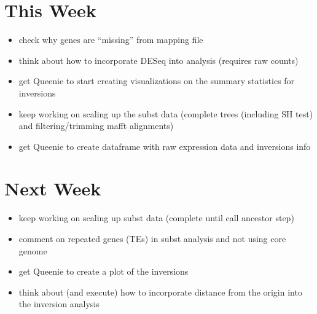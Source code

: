 \documentclass[12pt]{article}
\begin{document}

\section*{This Week}
%
\begin{itemize}
	\item check why genes are ``missing'' from mapping file
	\item think about how to incorporate DESeq into analysis (requires raw counts)
	\item get Queenie to start creating visualizations on the summary statistics for inversions
	\item keep working on scaling up the subst data (complete trees (including SH test) and filtering/trimming mafft alignments)
	\item get Queenie to create dataframe with raw expression data and inversions info
	
\end{itemize}


\section*{Next Week}
\begin{itemize}
	\item keep working on scaling up subst data (complete until call ancestor step)
	\item comment on repeated genes (TEs) in subst analysis and not using core genome
	\item get Queenie to create a plot of the inversions
	\item think about (and execute) how to incorporate distance from the origin into the inversion analysis
\end{itemize}
\end{document}
